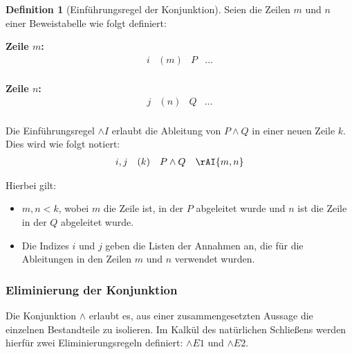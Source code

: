 \documentclass{book}
\theoremstyle{plain}
\theoremstyle{remark}
\theoremstyle{definition}
\newtheorem{definition}{Definition}[section]
\begin{document}
\begin{definition}[Einführungsregel der Konjunktion]
Seien die Zeilen \( m \) und \( n \) einer Beweistabelle wie folgt definiert:

\textbf{Zeile \( m \):}
\[
\begin{array}{llll}
    i & (m) & P & \dots \\
\end{array}
\]

\textbf{Zeile \( n \):}
\[
\begin{array}{llll}
    j & (n) & Q & \dots \\
\end{array}
\]

Die Einführungsregel \(\land I\) erlaubt die Ableitung von \( P \land Q \) in einer neuen Zeile \( k \). Dies wird wie folgt notiert:
\[
\begin{array}{llll}
    i, j & (k) & P \land Q & \rAI{m,n} \\
\end{array}
\]

Hierbei gilt:
\begin{itemize}
    \item \(m, n < k\), wobei \(m\) die Zeile ist, in der \(P\) abgeleitet wurde und \(n\) ist die Zeile in der \(Q\) abgeleitet wurde.
    \item Die Indizes \( i \) und \( j \) geben die Listen der Annahmen an, die für die Ableitungen in den Zeilen \( m \) und \( n \) verwendet wurden. 
\end{itemize}

\end{definition}

\subsubsection{Eliminierung der Konjunktion}
\label{rule:AE1}\label{rule:AE2}
Die Konjunktion \(\land\) erlaubt es, aus einer zusammengesetzten Aussage die einzelnen Bestandteile zu isolieren. Im Kalkül des natürlichen Schließens werden hierfür zwei Eliminierungsregeln definiert: \(\land E1\) und \(\land E2\).
\end{document}
